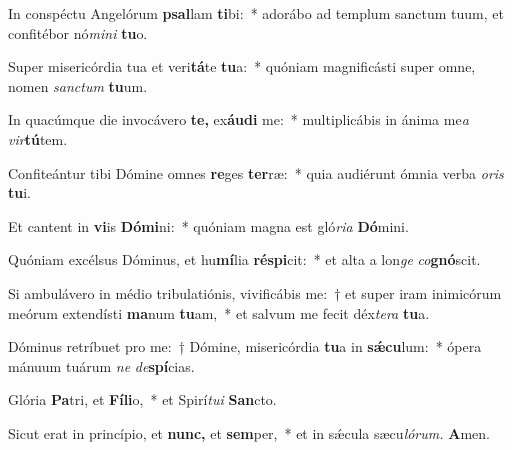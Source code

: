 \item In conspéctu Angelórum \textbf{psal}lam \textbf{ti}bi:~* adorábo ad templum sanctum tuum, et confitébor nó\textit{mini} \textbf{tu}o.
\item Super misericórdia tua et veri\textbf{tá}te \textbf{tu}a:~* quóniam magnificásti super omne, nomen \textit{sanctum} \textbf{tu}um.
\item In quacúmque die invocávero \textbf{te,} ex\textbf{áu}\textbf{di} me:~* multiplicábis in ánima me\tinyhspace\textit{a} \textit{vir}\textbf{tú}tem.
\item Confiteántur tibi Dómine omnes \textbf{re}ges \textbf{ter}ræ:~* quia audiérunt ómnia verba \textit{oris} \textbf{tu}i.
\item Et cantent in \textbf{vi}is \textbf{Dó}\textbf{mi}ni:~* quóniam magna est gló\textit{ria} \textbf{Dó}mini.
\item Quóniam excélsus Dóminus, et hu\textbf{mí}lia \textbf{ré}\textbf{spi}cit:~* et alta a lon\textit{ge} \textit{co}\textbf{gnó}scit.
\item Si ambulávero in médio tribulatiónis, vivificábis me:~† et super iram inimicórum meórum extendísti \textbf{ma}num \textbf{tu}am,~* et salvum me fecit déx\teenyhspace\textit{tera} \textbf{tu}a.
\item Dóminus retríbuet pro me:~† Dómine, misericórdia \textbf{tu}a in \textbf{sǽ}\textbf{cu}lum:~* ópera mánuum tuárum \textit{ne} \textit{de}\textbf{spí}cias.
\item Glória \textbf{Pa}tri, et \textbf{Fí}\textbf{li}o,~* et Spirí\tinyhspace\textit{tui} \textbf{San}cto.
\item Sicut erat in princípio, et \textbf{nunc,} et \textbf{sem}per,~* et in sǽcula sæcu\tinyhspace\textit{lórum.} \textbf{A}men.